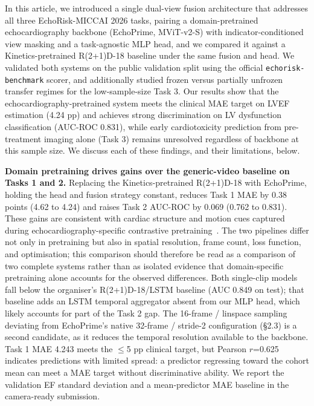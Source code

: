\documentclass[runningheads]{llncs}
\begin{document}
In this article, we introduced a single dual-view fusion architecture that addresses all three EchoRisk-MICCAI 2026 tasks, pairing a domain-pretrained echocardiography backbone (EchoPrime, MViT-v2-S) with indicator-conditioned view masking and a task-agnostic MLP head, and we compared it against a Kinetics-pretrained R(2+1)D-18 baseline under the same fusion and head. We validated both systems on the public validation split using the official \texttt{echorisk-benchmark} scorer, and additionally studied frozen versus partially unfrozen transfer regimes for the low-sample-size Task 3. Our results show that the echocardiography-pretrained system meets the clinical MAE target on LVEF estimation (4.24 pp) and achieves strong discrimination on LV dysfunction classification (AUC-ROC 0.831), while early cardiotoxicity prediction from pre-treatment imaging alone (Task 3) remains unresolved regardless of backbone at this sample size. We discuss each of these findings, and their limitations, below.

\noindent\textbf{Domain pretraining drives gains over the generic-video baseline on Tasks 1 and 2.} Replacing the Kinetics-pretrained R(2+1)D-18 with EchoPrime, holding the head and fusion strategy constant, reduces Task 1 MAE by 0.38 points (4.62 to 4.24) and raises Task 2 AUC-ROC by 0.069 (0.762 to 0.831). These gains are consistent with cardiac structure and motion cues captured during echocardiography-specific contrastive pretraining~\cite{ref_echoprime}. The two pipelines differ not only in pretraining but also in spatial resolution, frame count, loss function, and optimisation; this comparison should therefore be read as a comparison of two complete systems rather than as isolated evidence that domain-specific pretraining alone accounts for the observed differences. Both single-clip models fall below the organiser's R(2+1)D-18/LSTM baseline (AUC 0.849 on test); that baseline adds an LSTM temporal aggregator absent from our MLP head, which likely accounts for part of the Task 2 gap. The 16-frame / linspace sampling deviating from EchoPrime's native 32-frame / stride-2 configuration (\S2.3) is a second candidate, as it reduces the temporal resolution available to the backbone. Task 1 MAE 4.243 meets the $\le$5 pp clinical target, but Pearson $r$=0.625 indicates predictions with limited spread: a predictor regressing toward the cohort mean can meet a MAE target without discriminative ability. We report the validation EF standard deviation and a mean-predictor MAE baseline in the camera-ready submission.
\end{document}
